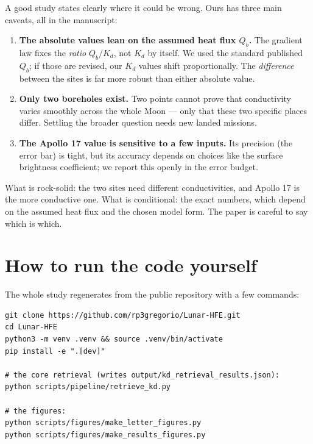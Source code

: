 \documentclass[11pt]{article}
\begin{document}
A good study states clearly where it could be wrong. Ours has three main
caveats, all in the manuscript:

\begin{enumerate}
\item \textbf{The absolute values lean on the assumed heat flux $Q_b$.}
      The gradient law fixes the \emph{ratio} $Q_b/K_d$, not $K_d$ by
      itself. We used the standard published $Q_b$; if those are revised,
      our $K_d$ values shift proportionally. The \emph{difference}
      between the sites is far more robust than either absolute value.
\item \textbf{Only two boreholes exist.} Two points cannot prove that
      conductivity varies smoothly across the whole Moon --- only that
      these two specific places differ. Settling the broader question
      needs new landed missions.
\item \textbf{The Apollo 17 value is sensitive to a few inputs.} Its
      precision (the error bar) is tight, but its accuracy depends on
      choices like the surface brightness coefficient; we report this
      openly in the error budget.
\end{enumerate}

\begin{plainbox}
What is rock-solid: the two sites need different conductivities, and
Apollo 17 is the more conductive one. What is conditional: the exact
numbers, which depend on the assumed heat flux and the chosen model form.
The paper is careful to say which is which.
\end{plainbox}

\section{How to run the code yourself}

The whole study regenerates from the public repository with a few
commands:

\begin{verbatim}
git clone https://github.com/rp3gregorio/Lunar-HFE.git
cd Lunar-HFE
python3 -m venv .venv && source .venv/bin/activate
pip install -e ".[dev]"

# the core retrieval (writes output/kd_retrieval_results.json):
python scripts/pipeline/retrieve_kd.py

# the figures:
python scripts/figures/make_letter_figures.py
python scripts/figures/make_results_figures.py
\end{verbatim}
\end{document}

